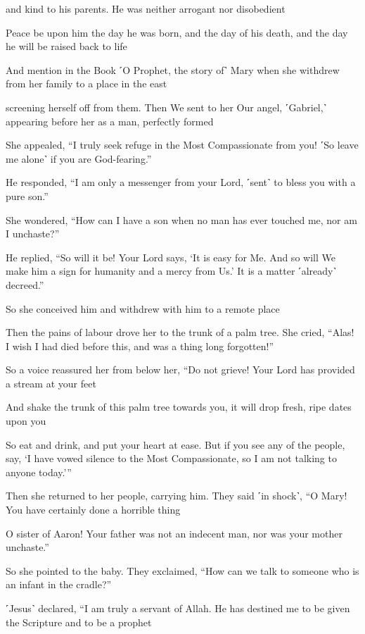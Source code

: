 and kind to his parents. He was neither arrogant nor disobedient

Peace be upon him the day he was born, and the day of his death, and the day he will be raised back to life

And mention in the Book ˹O Prophet, the story of˺ Mary when she withdrew from her family to a place in the east

screening herself off from them. Then We sent to her Our angel, ˹Gabriel,˺ appearing before her as a man, perfectly formed

She appealed, “I truly seek refuge in the Most Compassionate from you! ˹So leave me alone˺ if you are God-fearing.”

He responded, “I am only a messenger from your Lord, ˹sent˺ to bless you with a pure son.”

She wondered, “How can I have a son when no man has ever touched me, nor am I unchaste?”

He replied, “So will it be! Your Lord says, ‘It is easy for Me. And so will We make him a sign for humanity and a mercy from Us.’ It is a matter ˹already˺ decreed.”

So she conceived him and withdrew with him to a remote place

Then the pains of labour drove her to the trunk of a palm tree. She cried, “Alas! I wish I had died before this, and was a thing long forgotten!”

So a voice reassured her from below her, “Do not grieve! Your Lord has provided a stream at your feet

And shake the trunk of this palm tree towards you, it will drop fresh, ripe dates upon you

So eat and drink, and put your heart at ease. But if you see any of the people, say, ‘I have vowed silence to the Most Compassionate, so I am not talking to anyone today.’”

Then she returned to her people, carrying him. They said ˹in shock˺, “O Mary! You have certainly done a horrible thing

O sister of Aaron! Your father was not an indecent man, nor was your mother unchaste.”

So she pointed to the baby. They exclaimed, “How can we talk to someone who is an infant in the cradle?”

˹Jesus˺ declared, “I am truly a servant of Allah. He has destined me to be given the Scripture and to be a prophet

